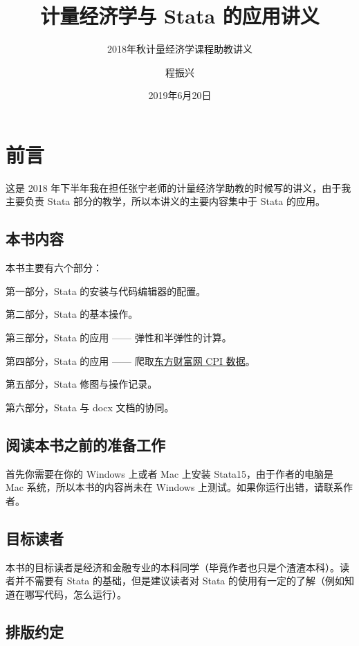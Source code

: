 \documentclass[cn,fancy,blue,11pt]{elegantbook}
\title{计量经济学与 Stata 的应用讲义}
\subtitle{2018年秋计量经济学课程助教讲义}
\author{程振兴}
\institute{https://czxa.top}
\date{2019年6月20日}
\begin{document}
\maketitle
\tableofcontents

\mainmatter
\hypersetup{pageanchor=true}

\hypertarget{section}{%
\chapter{前言}\label{section}}

这是 2018 年下半年我在担任张宁老师的计量经济学助教的时候写的讲义，由于我主要负责 Stata 部分的教学，所以本讲义的主要内容集中于 Stata 的应用。

\hypertarget{section-1}{%
\section{本书内容}\label{section-1}}

本书主要有六个部分：

第一部分，Stata 的安装与代码编辑器的配置。

第二部分，Stata 的基本操作。

第三部分，Stata 的应用 ------ 弹性和半弹性的计算。

第四部分，Stata 的应用 ------ 爬取\href{http://data.eastmoney.com/cjsj/cpi.html}{东方财富网 CPI 数据}。

第五部分，Stata 修图与操作记录。

第六部分，Stata 与 docx 文档的协同。

\hypertarget{section-2}{%
\section{阅读本书之前的准备工作}\label{section-2}}

首先你需要在你的 Windows 上或者 Mac 上安装 Stata15，由于作者的电脑是 Mac 系统，所以本书的内容尚未在 Windows 上测试。如果你运行出错，请联系作者。

\hypertarget{section-3}{%
\section{目标读者}\label{section-3}}

本书的目标读者是经济和金融专业的本科同学（毕竟作者也只是个渣渣本科）。读者并不需要有 Stata 的基础，但是建议读者对 Stata 的使用有一定的了解（例如知道在哪写代码，怎么运行）。

\hypertarget{section-4}{%
\section{排版约定}\label{section-4}}
\end{document}
